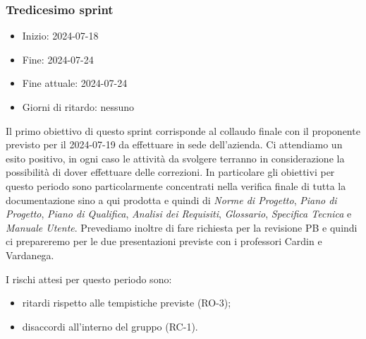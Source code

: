 \newpage
\subsubsection{Tredicesimo sprint}
\begin{itemize}
    \item Inizio: 2024-07-18
    \item Fine: 2024-07-24
    \item Fine attuale: 2024-07-24
    \item Giorni di ritardo: nessuno
\end{itemize}

Il primo obiettivo di questo sprint corrisponde al collaudo finale con il proponente previsto per il 2024-07-19 da effettuare in sede dell'azienda. Ci attendiamo un esito positivo, in ogni caso le attività da svolgere terranno in considerazione la possibilità di dover effettuare delle correzioni. In particolare gli obiettivi per questo periodo sono particolarmente concentrati nella verifica finale di tutta la documentazione sino a qui prodotta e quindi di \textit{Norme di Progetto}, \textit{Piano di Progetto}, \textit{Piano di Qualifica}, \textit{Analisi dei Requisiti}, \textit{Glossario}, \textit{Specifica Tecnica} e \textit{Manuale Utente}. Prevediamo inoltre di fare richiesta per la revisione PB e quindi ci prepareremo per le due presentazioni previste con i professori Cardin e Vardanega.

I rischi attesi per questo periodo sono:
\begin{itemize}
	\item ritardi rispetto alle tempistiche previste (RO-3);
    \item disaccordi all'interno del gruppo (RC-1).
\end{itemize}

